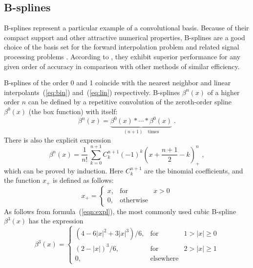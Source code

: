\subsection{B-splines}


B-splines represent a particular example of a convolutional basis.
Because of their compact support and other attractive numerical
properties, B-splines are a good choice of the basis set for the
forward interpolation problem and related signal processing problems
\cite[]{unser}.  According to \cite{handbook}, they exhibit superior
performance for any given order of accuracy in comparison with other
methods of similar efficiency.
\par
B-splines of the order 0 and 1 coincide with the nearest neighbor and
linear interpolants~(\ref{eq:bin}) and~(\ref{eq:lin}) respectively.
B-splines $\beta^n(x)$ of a higher order $n$ can be defined by a
repetitive convolution of the zeroth-order spline $\beta^0(x)$ (the
box function) with itself:
\begin{equation}
\label{eqn:bdef}
\beta^n(x) = 
\underbrace{\beta^0(x) \ast \cdots \ast \beta^0(x)}_{(n+1)\quad 
\mbox{times}}\;.
\end{equation}
There is also the explicit expression
\begin{equation}
\label{eqn:expl}
\beta^n(x) = 
\frac{1}{n!}\,\sum_{k=0}^{n+1} C_k^{n+1} (-1)^k 
(x + \frac{n+1}{2} - k)_{+}^n\;,
\end{equation}
which can be proved by induction. Here $C_k^{n+1}$ are the binomial
coefficients, and the function $x_{+}$ is defined as follows:
\begin{equation}
  \label{eqn:xp}
  x_{+} = \left\{\begin{array}{lcr}
x, & \mbox{for} & x > 0 \\
0, & \mbox{otherwise} &
\end{array}\right.
\end{equation}
As follows from formula~(\ref{eqn:expl}), the most commonly used cubic
B-spline $\beta^3(x)$ has the expression
\begin{equation}
  \label{eqn:beta3}
  \beta^3(x) = \left\{\begin{array}{lcr}
\displaystyle \left(4-6 |x|^2+3 |x|^3\right)/6, & 
\mbox{for} & 1 > |x| \geq 0 \\
\displaystyle (2-|x|)^3/6, & \mbox{for} & 2 > |x| \geq 1 \\
0, & \mbox{elsewhere} &
\end{array}\right.
\end{equation}
